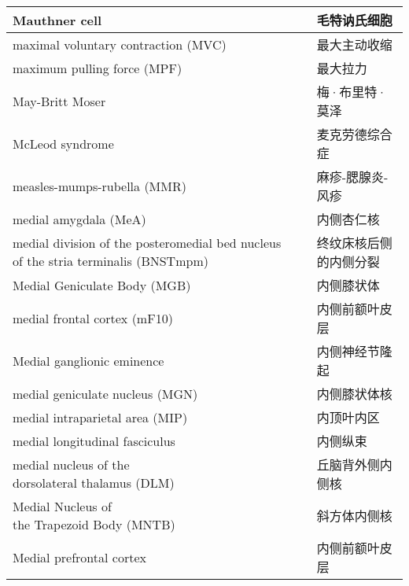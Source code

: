 \begin{longtable}{lll}
	\midrule
	Mauthner cell   && 毛特讷氏细胞  \\
	
	\midrule
	maximal voluntary contraction (MVC)   && 最大主动收缩  \\
	
	\midrule
	maximum pulling force (MPF)   && 最大拉力  \\
	
	\midrule
	May-Britt Moser   && 梅·布里特·莫泽  \\
	
	\midrule
	McLeod syndrome   && 麦克劳德综合症  \\
	
	\midrule
	measles-mumps-rubella (MMR)   && 麻疹-腮腺炎-风疹  \\
	
	\midrule
	medial amygdala (MeA)  && 内侧杏仁核  \\
	
	\midrule
	medial division of the posteromedial bed nucleus of the stria terminalis (BNSTmpm)   && 终纹床核后侧的内侧分裂  \\
	
	\midrule
	Medial Geniculate Body (MGB)   && 内侧膝状体  \\
	
	\midrule
	medial frontal cortex (mF10)   && 内侧前额叶皮层  \\
	
	\midrule
	Medial ganglionic eminence   && 内侧神经节隆起  \\
	
	\midrule
	medial geniculate nucleus (MGN)  && 内侧膝状体核  \\
	
	\midrule
	medial intraparietal area (MIP)   && 内顶叶内区  \\
	
	\midrule
	medial longitudinal fasciculus   && 内侧纵束  \\
	
	\midrule
	\makecell[l]{medial nucleus of the\\ dorsolateral thalamus (DLM)}  && 丘脑背外侧内侧核  \\
	
	\midrule
	\makecell[l]{Medial Nucleus of \\the Trapezoid Body (MNTB)}   && 斜方体内侧核  \\
	
	\midrule
	Medial prefrontal cortex    && 内侧前额叶皮层  \\
	

\end{longtable}
